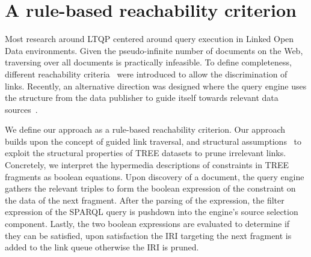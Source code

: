 \section{A rule-based reachability criterion}


Most research around LTQP centered around query execution in Linked Open Data environments.
Given the pseudo-infinite number of documents on the Web, traversing over all documents is practically infeasible.
To define completeness, different reachability criteria~\cite{hartig2012} were introduced to allow the discrimination of links.
Recently, an alternative direction was designed where the query engine uses the structure from the data publisher to guide itself towards relevant data sources~\cite{taelman2023, verborgh2020}.

We define our approach as a rule-based reachability criterion.
Our approach builds upon the concept of guided link traversal, and structural assumptions~\cite{taelman2023} to exploit the structural properties of TREE datasets to prune irrelevant links.
Concretely, we interpret the hypermedia descriptions of constraints in TREE fragments as boolean equations.
Upon discovery of a document, the query engine gathers the relevant triples to form the boolean expression of the constraint on the data of the next fragment.
After the parsing of the expression, the filter expression of the SPARQL query is pushdown into the engine's source selection component.
Lastly, the two boolean expressions are evaluated to determine if they can be satisfied, upon satisfaction the IRI targeting the next fragment is added to the link queue otherwise the IRI is pruned.


